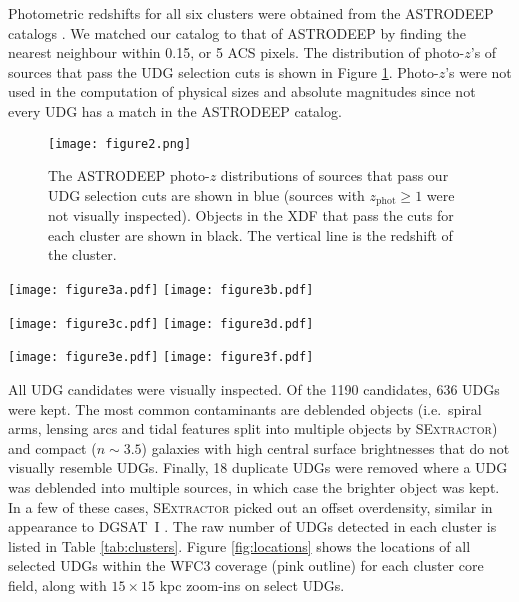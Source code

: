 \documentclass[iop,tighten,twocolumn,apj,floatfix]{emulateapj}
\begin{document}
Photometric redshifts for all six clusters were obtained from the
\textsc{ASTRODEEP} catalogs \citep{castellano2016,merlin2016,bradac2019}.
We matched our catalog to that of \textsc{ASTRODEEP} by finding the nearest
neighbour within 0.15\arcsec, or 5 ACS pixels.
The distribution of photo-$z$'s of sources that pass the UDG selection cuts
is shown in Figure \ref{fig:photo-z}.
Photo-$z$'s were not used in the computation of physical sizes and absolute
magnitudes since not every UDG has a match in the \textsc{ASTRODEEP} catalog.

\begin{figure}
	\texttt{[image: figure2.png]}
	\caption{
    The \textsc{ASTRODEEP} photo-$z$ distributions of sources that pass our
    UDG selection cuts are shown in blue (sources with $z_\mathrm{phot} \geq
    1$ were not visually inspected).
    Objects in the XDF that pass the cuts for each cluster are shown in black.
    The vertical line is the redshift of the cluster.
    \label{fig:photo-z}
	}
\end{figure}

\begin{figure*}
	\texttt{[image: figure3a.pdf]}
    \texttt{[image: figure3b.pdf]}
	\caption{
    Locations of selected UDGs (red points) in the Abell~2744 and Abell~S1063
    cluster core fields.
    The background image is the ACS $F814W$ image and the pink border is the
    extent of the WFC3/IR coverage.
    North is up and east is to the left.
    The bar below the compass corresponds to 200 kpc. 
    Insets show zoom-ins on select UDGs, the sizes of which are 15 kpc a side.
    \label{fig:locations}
	}
\end{figure*}
\begin{figure*}
    \ContinuedFloat
	\texttt{[image: figure3c.pdf]}
	\texttt{[image: figure3d.pdf]}
    \caption{(Continued.) Abell~370 and MACS~0416 cluster core fields.}
\end{figure*}
\begin{figure*}
    \ContinuedFloat
	\texttt{[image: figure3e.pdf]}
	\texttt{[image: figure3f.pdf]}
    \caption{(Continued.) MACS~1149 and MACS~0717 cluster core fields.}
\end{figure*}

All UDG candidates were visually inspected. Of the 1190 candidates, 636
UDGs were kept. The most common contaminants are deblended objects (i.e.\
spiral arms, lensing arcs and tidal features split into multiple objects by
\textsc{SExtractor}) and compact ($n \sim 3.5$) galaxies with high central
surface brightnesses that do not visually resemble UDGs. Finally, 18 duplicate
UDGs were removed where a UDG was deblended into multiple sources, in which
case the brighter object was kept.
In a few of these cases, \textsc{SExtractor} picked out an offset overdensity,
similar in appearance to DGSAT~I \citep{martinez-delgado2016}.
The raw number of UDGs detected in each cluster is listed in Table
\ref{tab:clusters}.
Figure \ref{fig:locations} shows the locations of all selected UDGs within the
WFC3 coverage (pink outline) for each cluster core field, along with $15
\times 15$ kpc zoom-ins on select UDGs.
\end{document}
